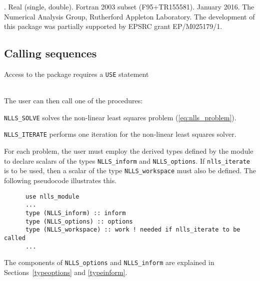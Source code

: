 \documentclass{spec}
\begin{document}
\hslheader

\hslsummary



\hslattributes
\hslversions{\versionum\ (\versiondate)}.
\hslIRDCZ Real (single, double).
\hsllanguage Fortran 2003 subset (F95+TR155581).
\hsldate January 2016.
\hslorigin The Numerical Analysis Group, Rutherford Appleton Laboratory.
\hslremark The development of this package was
partially supported by EPSRC grant EP/M025179/1.

\newpage
\hslhowto

\subsection{Calling sequences}

Access to the package requires a {\tt USE} statement \\ \\
\indent\hspace{5mm}{\tt use ral\_nlls\_double}
\medskip

\noindent The user can then call one of the procedures:
\vspace{-0.1cm}
\begin{description}
\item {\tt NLLS\_SOLVE}  solves the non-linear least squares problem (\ref{eq:nlls_problem}).
\item {\tt NLLS\_ITERATE} performs one iteration for the non-linear least squares solver.
\end{description}


\hsltypes
\label{derived types}
For each problem, the user must employ the derived types defined by the
module to declare scalars of the types {\tt NLLS\_inform} and
{\tt NLLS\_options}.  If {\tt nlls\_iterate} is to be used, then 
a scalar of the type {\tt NLLS\_workspace} must also be defined.
The following pseudocode illustrates this.
\begin{verbatim}
      use nlls_module
      ...
      type (NLLS_inform) :: inform
      type (NLLS_options) :: options
      type (NLLS_workspace) :: work ! needed if nlls_iterate to be called
      ...
\end{verbatim}
The components of {\tt NLLS\_options} and {\tt NLLS\_inform} are explained
in Sections~\ref{typeoptions} and \ref{typeinform}.
\end{document}
